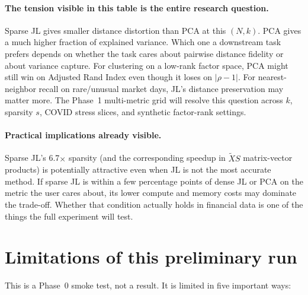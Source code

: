 \documentclass[11pt]{article}
\begin{document}
\paragraph{The tension visible in this table is the entire research question.}
Sparse JL gives smaller distance distortion than PCA at this $(N, k)$. PCA gives a much higher fraction of explained variance. Which one a downstream task prefers depends on whether the task cares about pairwise distance fidelity or about variance capture. For clustering on a low-rank factor space, PCA might still win on Adjusted Rand Index even though it loses on $|\rho - 1|$. For nearest-neighbor recall on rare/unusual market days, JL's distance preservation may matter more. The Phase~1 multi-metric grid will resolve this question across $k$, sparsity $s$, COVID stress slices, and synthetic factor-rank settings.

\paragraph{Practical implications already visible.}
Sparse JL's 6.7$\times$ sparsity (and the corresponding speedup in $\widetilde{X} S$ matrix-vector products) is potentially attractive even when JL is not the most accurate method. If sparse JL is within a few percentage points of dense JL or PCA on the metric the user cares about, its lower compute and memory costs may dominate the trade-off. Whether that condition actually holds in financial data is one of the things the full experiment will test.

\section{Limitations of this preliminary run}

This is a Phase~0 smoke test, not a result. It is limited in five important ways:
\end{document}
